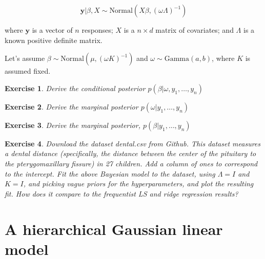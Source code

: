 \documentclass[twoside]{article}
\newcounter{lecnum}
\newtheorem{exercise}{Exercise}[lecnum]
\begin{document}
$$\mathbf{y}|\beta, X \sim \mbox{Normal}(X\beta, (\omega \Lambda)^{-1})$$



where $\mathbf{y}$ is a vector of $n$ responses; $X$ is a $n\times d$ matrix of covariates; and $\Lambda$ is a known positive definite matrix.

Let's assume $\beta\sim \mbox{Normal}(\mu, (\omega K)^{-1})$ and $\omega \sim \mbox{Gamma}(a,b)$, where $K$ is assumed fixed.





\begin{exercise}

  Derive the conditional posterior $p(\beta|\omega, y_1,\dots, y_n)$

\end{exercise}



\begin{exercise}

  Derive the marginal posterior $p(\omega|y_1,\dots, y_n)$

\end{exercise}



\begin{exercise}

  Derive the marginal posterior, $p(\beta|y_1,\dots, y_n)$

\end{exercise}





\begin{exercise}

  Download the dataset dental.csv from Github. This dataset measures a dental distance (specifically, the distance between the center of the pituitary to the pterygomaxillary fissure) in 27 children. Add a column of ones to correspond to the intercept. Fit the above Bayesian model to the dataset, using $\Lambda=I$ and $K=I$, and picking vague priors for the hyperparameters, and plot the resulting fit. How does it compare to the frequentist LS and ridge regression results?

\end{exercise}







\section{A hierarchical Gaussian linear model}
\end{document}
